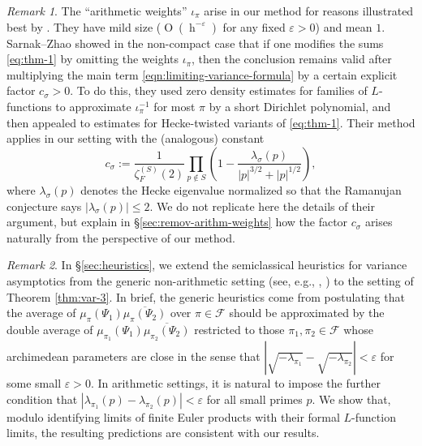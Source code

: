 \documentclass[reqno,10pt]{amsart}
\theoremstyle{plain} %
\theoremstyle{definition}
\theoremstyle{plain} %
\theoremstyle{remark}
\newtheorem{remark}             {Remark}
\theoremstyle{itplain} %
\theoremstyle{remark} %
\renewcommand{\leq}{\leqslant}
\numberwithin{equation}{section}
\def\eps{\varepsilon}
\def\O{\operatorname{O}}
\DeclareMathOperator{\h}{h}
\begin{document}
\begin{remark}\label{rmk:removing-weights}
  The ``arithmetic weights'' $\iota_{\pi}$ arise in our method for reasons illustrated best by \cite[\S2.8, \S7]{nelson-variance-73-2}.  They have mild size ($\O(\h^{-\eps})$ for any fixed $\eps > 0$) and mean $1$.  Sarnak--Zhao \cite{2013arXiv1303.6972S} showed in the non-compact case that if one modifies the sums \eqref{eq:thm-1} by omitting the weights $\iota_{\pi}$, then the conclusion remains valid after multiplying the main term \eqref{eqn:limiting-variance-formula} by a certain explicit factor $c_\sigma > 0$.  To do this, they used zero density estimates for families of $L$-functions to approximate $\iota_{\pi}^{-1}$ for most $\pi$ by a short Dirichlet polynomial, and then appealed to estimates for Hecke-twisted variants of \eqref{eq:thm-1}.  Their method applies in our setting with the (analogous) constant
  \begin{equation}\label{eq:c-sigma-defn}
    c_\sigma :=
    \frac{1}{\zeta_F^{(S)}(2)}
    \prod_{p \notin S}
    \left( 1 - \frac{\lambda_\sigma(p)}{|p|^{3/2} + |p|^{1/2}}
    \right),
  \end{equation}
  where $\lambda_\sigma(p)$ denotes the Hecke eigenvalue normalized so that the Ramanujan conjecture says $|\lambda_\sigma(p)| \leq 2$.  We do not replicate here the details of their argument, but explain in \S\ref{sec:remov-arithm-weights} how the factor $c_\sigma$ arises naturally from the perspective of our method.
\end{remark}
\begin{remark}
  In \S\ref{sec:heuristics}, we extend the semiclassical heuristics for variance asymptotics from the generic non-arithmetic setting (see, e.g.,  \cite[\S15.6]{2009arXiv0911.4312Z}, \cite[\S4.1.3]{MR3204186}) to the setting of Theorem \ref{thm:var-3}.  In brief, the generic heuristics come from postulating that the average of $\mu_\pi(\Psi_1) \overline{\mu_\pi (\Psi_2)}$ over $\pi \in \mathcal{F}$ should be approximated by the double average of $\mu_{\pi_1}(\Psi_1) \overline{\mu_{\pi_2} (\Psi_2)}$ restricted to those $\pi_1, \pi_2 \in \mathcal{F}$ whose archimedean parameters are close in the sense that $\left\lvert \sqrt{- \lambda_{\pi_1}} - \sqrt{- \lambda_{\pi_2}} \right\rvert < \eps$ for some small $\eps > 0$.  In arithmetic settings, it is natural to impose the further condition that $\left\lvert \lambda_{\pi_1}(p) - \lambda_{\pi_2}(p) \right\rvert < \eps$ for all small primes $p$.  We show that, modulo identifying limits of finite Euler products with their formal $L$-function limits, the resulting predictions are consistent with our results.
\end{remark}
\end{document}
